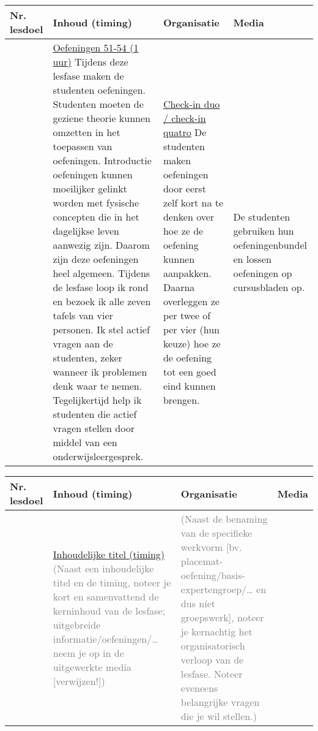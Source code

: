 \begin{landscape}
\begin{tabularx}{1.56\textwidth}{|p{1.5cm}|p{6cm}|X|p{4cm}|}
	\hline
	\textbf{Nr. lesdoel } & \textbf{Inhoud (timing)}  & \textbf{Organisatie } & \textbf{Media } \\ \hline
	&\underline{Oefeningen 51-54 (1 uur)}\newline
	Tijdens deze lesfase maken de studenten oefeningen. Studenten moeten de geziene theorie kunnen omzetten in het toepassen van oefeningen. Introductie oefeningen kunnen moeilijker gelinkt worden met fysische concepten die in het dagelijkse leven aanwezig zijn.  Daarom zijn deze oefeningen heel algemeen.\newline
	Tijdens de lesfase loop ik rond en bezoek ik alle zeven tafels van vier personen. Ik stel actief vragen aan de studenten, zeker wanneer ik problemen denk waar te nemen. Tegelijkertijd help ik studenten die actief vragen stellen door middel van een onderwijsleergesprek.  
	&  \underline{Check-in duo / check-in quatro}\newline 
	De studenten maken oefeningen door eerst zelf kort na te denken over hoe ze de oefening kunnen aanpakken. Daarna overleggen ze per twee of per vier (hun keuze) hoe ze de oefening tot een goed eind kunnen brengen.
	& De studenten gebruiken hun oefeningenbundel en lossen oefeningen op cursusbladen op.
	\\ \hline
\end{tabularx}


	
	
	\begin{tabularx}{1.56\textwidth}{|p{1.5cm}|p{6cm}|X|p{4cm}|}
		\hline
		\textbf{Nr. lesdoel } & \textbf{Inhoud (timing)}  & \textbf{Organisatie } & \textbf{Media } \\ \hline
		&\underline{Inhoudelijke titel (timing)}
	    \textcolor{gray}{(Naast een inhoudelijke titel en de timing, noteer je kort en samenvattend de kerninhoud van de lesfase; uitgebreide informatie/oefeningen/… neem je op in de uitgewerkte media [verwijzen!])}
	    &  \textcolor{gray}{(Naast de benaming van de specifieke werkvorm [bv. placemat-oefening/basis-expertengroep/… en dus níet groepswerk], noteer je kernachtig het organisatorisch verloop van de lesfase. Noteer eveneens belangrijke vragen die je wil stellen.) }
		& 
		\\ \hline
	\end{tabularx}
	
	
	
	
	
	
	
	
\end{landscape}